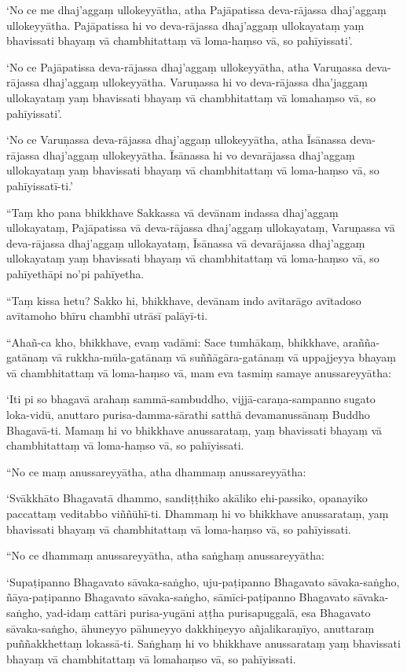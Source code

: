 ‘No ce me dhaj’aggaṃ ullokeyyātha, atha Pajāpatissa deva-rājassa dhaj’aggaṃ
ullokeyyātha. Pajāpatissa hi vo deva-rājassa dhaj’aggaṃ ullokayataṃ yaṃ
bhavissati bhayaṃ vā chambhitattaṃ vā loma-haṃso vā, so pahīyissati’.

‘No ce Pajāpatissa deva-rājassa dhaj’aggaṃ ullokeyyātha, atha Varuṇassa
deva-rājassa dhaj’aggaṃ ullokeyyātha. Varuṇassa hi vo deva-rājassa dha’jaggaṃ
ullokayataṃ yaṃ bhavissati bhayaṃ vā chambhitattaṃ vā lomahaṃso vā, so
pahīyissati’.

‘No ce Varuṇassa deva-rājassa dhaj’aggaṃ ullokeyyātha, atha Īsānassa
deva-rājassa dhaj’aggaṃ ullokeyyātha. Īsānassa hi vo devarājassa dhaj’aggaṃ
ullokayataṃ yaṃ bhavissati bhayaṃ vā chambhitattaṃ vā loma-haṃso vā, so
pahīyissatī-ti.’

“Taṃ kho pana bhikkhave Sakkassa vā devānam indassa dhaj’aggaṃ ullokayataṃ,
Pajāpatissa vā deva-rājassa dhaj’aggaṃ ullokayataṃ, Varuṇassa vā deva-rājassa
dhaj’aggaṃ ullokayataṃ, Īsānassa vā devarājassa dhaj’aggaṃ ullokayataṃ yaṃ
bhavissati bhayaṃ vā chambhitattaṃ vā loma-haṃso vā, so pahīyethāpi no’pi
pahīyetha.

“Taṃ kissa hetu? Sakko hi, bhikkhave, devānam indo avītarāgo avītadoso avītamoho
bhīru chambhī utrāsī palāyī-ti.

“Ahañ-ca kho, bhikkhave, evaṃ vadāmi: Sace tumhākaṃ, bhikkhave, arañña-gatānaṃ
vā rukkha-mūla-gatānaṃ vā suññāgāra-gatānaṃ vā uppajjeyya bhayaṃ vā
chambhitattaṃ vā loma-haṃso vā, mam eva tasmiṃ samaye anussareyyātha:

‘Iti pi so bhagavā arahaṃ sammā-sambuddho, vijjā-caraṇa-sampanno sugato
loka-vidū, anuttaro purisa-damma-sārathi satthā devamanussānaṃ Buddho
Bhagavā-ti. Mamaṃ hi vo bhikkhave anussarataṃ, yaṃ bhavissati bhayaṃ vā
chambhitattaṃ vā loma-haṃso vā, so pahīyissati.

“No ce maṃ anussareyyātha, atha dhammaṃ anussareyyātha:

‘Svākkhāto Bhagavatā dhammo, sandiṭṭhiko akāliko ehi-passiko, opanayiko
paccattaṃ veditabbo viññūhī-ti. Dhammaṃ hi vo bhikkhave anussarataṃ, yaṃ
bhavissati bhayaṃ vā chambhitattaṃ vā loma-haṃso vā, so pahīyissati.

“No ce dhammaṃ anussareyyātha, atha saṅghaṃ anussareyyātha:

‘Supaṭipanno Bhagavato sāvaka-saṅgho, uju-paṭipanno Bhagavato sāvaka-saṅgho,
ñāya-paṭipanno Bhagavato sāvaka-saṅgho, sāmīci-paṭipanno Bhagavato
sāvaka-saṅgho, yad-idaṃ cattāri purisa-yugāni aṭṭha purisapuggalā, esa Bhagavato
sāvaka-saṅgho, āhuneyyo pāhuneyyo dakkhiṇeyyo añjalikaraṇīyo, anuttaraṃ
puññakkhettaṃ lokassā-ti. Saṅghaṃ hi vo bhikkhave anussarataṃ yaṃ bhavissati
bhayaṃ vā chambhitattaṃ vā lomahaṃso vā, so pahīyissati.

